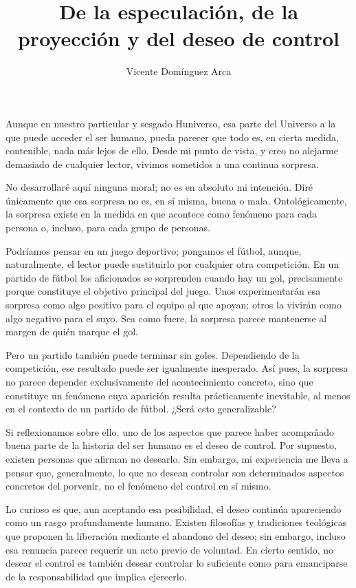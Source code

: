 \documentclass[12pt,a4paper]{article}
\title{De la especulación, de la proyección y del deseo de control}
\author{Vicente Domínguez Arca}
\date{}
\begin{document}
\maketitle

Aunque en nuestro particular y sesgado Huniverso, esa parte del Universo a la que puede acceder el ser humano, pueda parecer que todo es, en cierta medida, contenible, nada más lejos de ello. Desde mi punto de vista, y creo no alejarme demasiado de cualquier lector, vivimos sometidos a una continua sorpresa.

No desarrollaré aquí ninguna moral; no es en absoluto mi intención. Diré únicamente que esa sorpresa no es, en sí misma, buena o mala. Ontológicamente, la sorpresa existe en la medida en que acontece como fenómeno para cada persona o, incluso, para cada grupo de personas.

Podríamos pensar en un juego deportivo; pongamos el fútbol, aunque, naturalmente, el lector puede sustituirlo por cualquier otra competición. En un partido de fútbol los aficionados se sorprenden cuando hay un gol, precisamente porque constituye el objetivo principal del juego. Unos experimentarán esa sorpresa como algo positivo para el equipo al que apoyan; otros la vivirán como algo negativo para el suyo. Sea como fuere, la sorpresa parece mantenerse al margen de quién marque el gol.

Pero un partido también puede terminar sin goles. Dependiendo de la competición, ese resultado puede ser igualmente inesperado. Así pues, la sorpresa no parece depender exclusivamente del acontecimiento concreto, sino que constituye un fenómeno cuya aparición resulta prácticamente inevitable, al menos en el contexto de un partido de fútbol. ¿Será esto generalizable?

Si reflexionamos sobre ello, uno de los aspectos que parece haber acompañado buena parte de la historia del ser humano es el deseo de control. Por supuesto, existen personas que afirman no desearlo. Sin embargo, mi experiencia me lleva a pensar que, generalmente, lo que no desean controlar son determinados aspectos concretos del porvenir, no el fenómeno del control en sí mismo.

Lo curioso es que, aun aceptando esa posibilidad, el deseo continúa apareciendo como un rasgo profundamente humano. Existen filosofías y tradiciones teológicas que proponen la liberación mediante el abandono del deseo; sin embargo, incluso esa renuncia parece requerir un acto previo de voluntad. En cierto sentido, no desear el control es también desear controlar lo suficiente como para emanciparse de la responsabilidad que implica ejercerlo.
\end{document}
